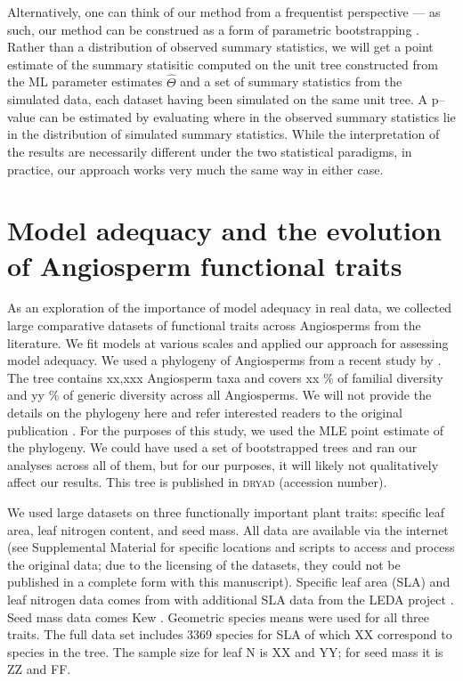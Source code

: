 \documentclass[a4paper,12pt]{article}
\begin{document}
Alternatively, one can think of our method from a frequentist perspective --- as such, our method can be construed as a form of parametric bootstrapping \citep{Efronbootstrap}. Rather than a distribution of observed summary statistics, we will get a point estimate of the summary statisitic computed on the unit tree constructed from the ML parameter estimates $\hat{\Theta}$ and a set of summary statistics from the simulated data, each dataset having been simulated on the same unit tree. A p--value can be estimated by evaluating where in the observed summary statistics lie in the distribution of simulated summary statistics. While the interpretation of the results are necessarily different under the two statistical paradigms, in practice, our approach works very much the same way in either case.

\section*{Model adequacy and the evolution of Angiosperm functional traits}
As an exploration of the importance of model adequacy in real data, we collected large comparative datasets of functional traits across Angiosperms from the literature. We fit models at various scales and applied our approach for assessing model adequacy. We used a phylogeny of Angiosperms from a recent study by \citet{Zanne2013}. The tree contains xx,xxx Angiosperm taxa and covers xx \% of familial diversity and yy \% of generic diversity across all Angiosperms. We will not provide the details on the phylogeny here and refer interested readers to the original publication \citep{Zanne2013}. For the purposes of this study, we used the MLE point estimate of the phylogeny. We could have used a set of bootstrapped trees and ran our analyses across all of them, but for our purposes, it will likely not qualitatively affect our results. This tree is published in \textsc{dryad} (accession number).

We used large datasets on three functionally important plant traits: specific leaf area, leaf nitrogen content, and seed mass.  All data are available via the internet (see Supplemental Material for specific locations and scripts to access and process the original data; due to the licensing of the datasets, they could not be published in a complete form with this manuscript). Specific leaf area (SLA) and leaf nitrogen data comes from \citet{Wright2004} with additional SLA data from the LEDA project \citep{Kleyer2008}.   Seed mass data comes Kew \citep{Kew2008}.  Geometric species means were used for all three traits.  The full data set includes 3369 species for SLA of which XX correspond to species in the \citet{Zanne2013} tree.  The sample size for leaf N is XX and YY; for seed mass it is ZZ and FF.  
\end{document}
